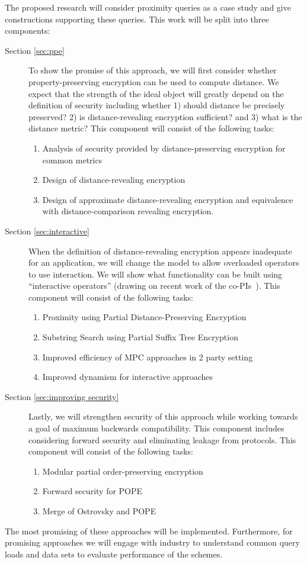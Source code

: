 \noindent
The proposed research will
consider proximity queries as a case study and give constructions supporting
these queries.  This work will be split into three components:
\begin{description}
\item[Section \ref{sec:ppe}] To show the promise of this approach, we will first consider whether property-preserving encryption can be used to compute distance.  We expect that the strength of the ideal object will greatly depend on the definition of security including whether 1) should distance be precisely preserved? 2) is distance-revealing encryption sufficient? and 3) what is the distance metric? This component will consist of the following tasks:
\begin{enumerate}
\item Analysis of security provided by distance-preserving encryption for common metrics
\item Design of distance-revealing encryption
\item Design of approximate distance-revealing encryption and equivalence with distance-comparison revealing encryption.
\end{enumerate}

\item[Section \ref{sec:interactive}] When the definition of distance-revealing encryption appears inadequate for an application, we will change the model to allow overloaded operators to use interaction.  We will show what functionality can be built using ``interactive operators'' (drawing on recent work of the co-PIs~\cite{SP:PKVKMC14,CCS:RACY16}).  This component will consist of the following tasks:
\begin{enumerate}
\item Proximity using Partial Distance-Preserving Encryption
\item Substring Search using Partial Suffix Tree Encryption
\item Improved efficiency of MPC approaches in 2 party setting
\item Improved dynamism for interactive approaches
\end{enumerate}

\item[Section \ref{sec:improving security}] Lastly, we will strengthen security of this approach while working towards a goal of maximum backwards compatibility.  This component includes considering forward security and eliminating leakage from protocols. This component will consist of the following tasks:
\begin{enumerate}
\item Modular partial order-preserving encryption
\item Forward security for POPE
\item Merge of Ostrovsky and POPE
\end{enumerate}
\end{description}
The most promising of these approaches will be implemented.  Furthermore, for promising approaches we will engage with industry to understand common query loads and data sets to evaluate performance of the schemes.


